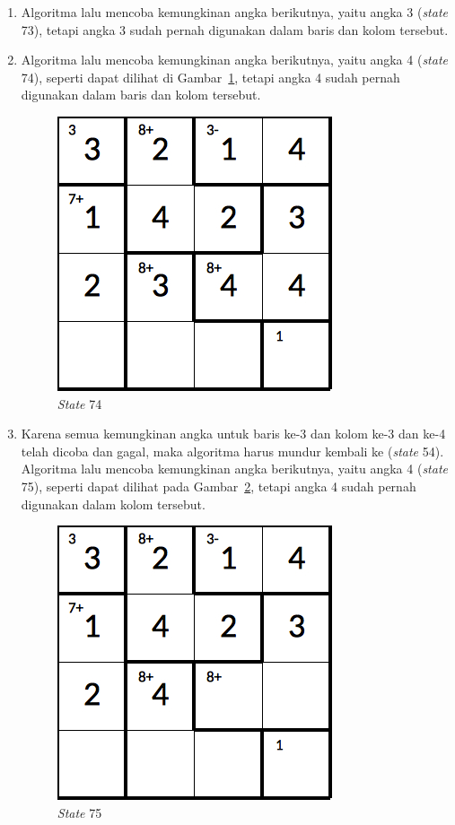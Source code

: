 \begin{enumerate}
\item Algoritma lalu mencoba kemungkinan angka berikutnya, yaitu angka 3 (\textit{state} 73), tetapi angka 3 sudah pernah digunakan dalam baris dan kolom tersebut.
\item Algoritma lalu mencoba kemungkinan angka berikutnya, yaitu angka 4 (\textit{state} 74), seperti dapat dilihat di Gambar~\ref{fig:lampiranbt22}, tetapi angka 4 sudah pernah digunakan dalam baris dan kolom tersebut.

\begin{figure}
\centering
\captionsetup{justification=centering}
\includegraphics[scale=0.333]{Gambar/backtracking/State74}
\caption[\textit{State} 74]{\textit{State} 74}
\label{fig:lampiranbt22}
\end{figure}

\item Karena semua kemungkinan angka untuk baris ke-3 dan kolom ke-3 dan ke-4 telah dicoba dan gagal, maka algoritma harus mundur kembali ke (\textit{state} 54). Algoritma lalu mencoba kemungkinan angka berikutnya, yaitu angka 4 (\textit{state} 75), seperti dapat dilihat pada Gambar~\ref{fig:lampiranbt23}, tetapi angka 4 sudah pernah digunakan dalam kolom tersebut.

\begin{figure}
\centering
\captionsetup{justification=centering}
\includegraphics[scale=0.333]{Gambar/backtracking/State75}
\caption[\textit{State} 75]{\textit{State} 75}
\label{fig:lampiranbt23}
\end{figure}


\end{enumerate}
